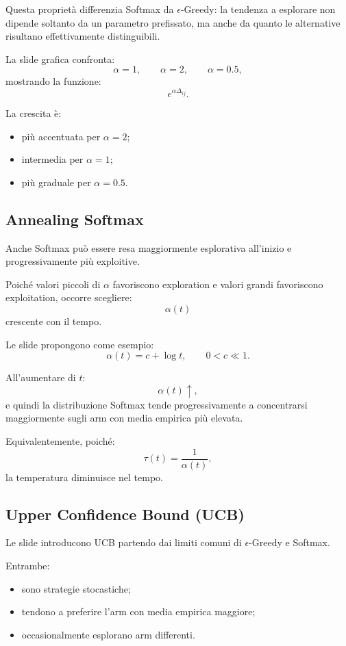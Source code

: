 Questa proprietà differenzia Softmax da $\epsilon$-Greedy: la tendenza a esplorare non dipende soltanto da un parametro prefissato, ma anche da quanto le alternative risultano effettivamente distinguibili.

La slide grafica confronta:
\[
\alpha=1,\qquad
\alpha=2,\qquad
\alpha=0.5,
\]
mostrando la funzione:
\[
e^{\alpha\Delta_{ij}}.
\]

La crescita è:
\begin{itemize}
    \item più accentuata per $\alpha=2$;
    \item intermedia per $\alpha=1$;
    \item più graduale per $\alpha=0.5$.
\end{itemize}



\subsection{Annealing Softmax}

Anche Softmax può essere resa maggiormente esplorativa all'inizio e progressivamente più exploitive.

Poiché valori piccoli di $\alpha$ favoriscono exploration e valori grandi favoriscono exploitation, occorre scegliere:
\[
\alpha(t)
\]
crescente con il tempo.

Le slide propongono come esempio:
\[
\alpha(t)=c+\log t,
\qquad
0<c\ll1.
\]

All'aumentare di $t$:
\[
\alpha(t)\uparrow,
\]
e quindi la distribuzione Softmax tende progressivamente a concentrarsi maggiormente sugli arm con media empirica più elevata.

Equivalentemente, poiché:
\[
\tau(t)=\frac{1}{\alpha(t)},
\]
la temperatura diminuisce nel tempo.

\newpage

\subsection{Upper Confidence Bound (UCB)}

Le slide introducono UCB partendo dai limiti comuni di $\epsilon$-Greedy e Softmax.

Entrambe:
\begin{itemize}
    \item sono strategie stocastiche;
    \item tendono a preferire l'arm con media empirica maggiore;
    \item occasionalmente esplorano arm differenti.
\end{itemize}

